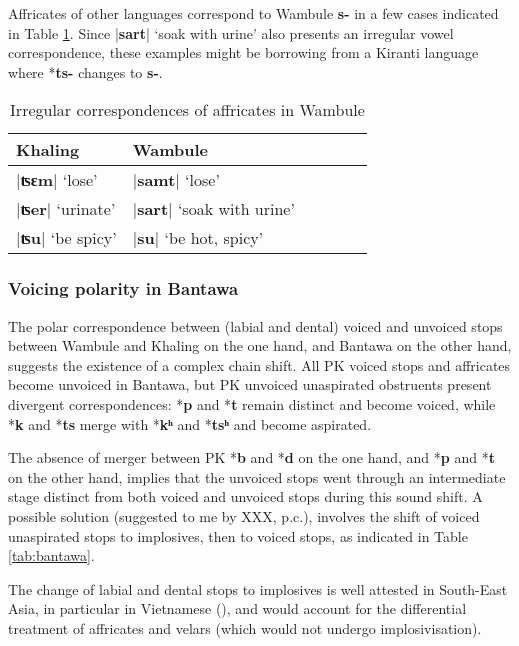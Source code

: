 \documentclass[oldfontcommands,oneside,a4paper,11pt]{article}
\newcommand{\ipa}[1]{\textbf{{\phon\mbox{#1}}}} %
\newcommand{\dhatu}[2]{|\ipa{#1}| `#2'}
\begin{document}
Affricates of other languages correspond to Wambule \ipa{s-} in a few cases indicated in Table \ref{tab:affricates.wambule}. Since \dhatu{sart}{soak with urine} also presents an irregular vowel correspondence, these examples might  be borrowing from a Kiranti language where *\ipa{ts-} changes to \ipa{s-}.

\begin{table}[H]
\caption{Irregular correspondences of affricates in Wambule} \centering \label{tab:affricates.wambule}
\begin{tabular}{llllll}
\toprule
Khaling & Wambule \\
\midrule
\dhatu{ʦɛm}{lose} & \dhatu{samt}{lose}\\
\dhatu{ʦer}{urinate} & \dhatu{sart}{soak with urine} \\
\dhatu{ʦu}{be spicy} & \dhatu{su}{be hot, spicy}\\
\bottomrule
\end{tabular}
\end{table}

\subsubsection{Voicing polarity in Bantawa} \label{sec:fourth}
The polar correspondence between (labial and dental) voiced and unvoiced stops between Wambule and Khaling on the one hand, and Bantawa on the other hand, suggests the existence of a complex chain shift. All PK voiced stops and affricates become unvoiced in Bantawa, but PK unvoiced unaspirated obstruents  present divergent correspondences: *\ipa{p} and *\ipa{t} remain distinct and become voiced, while *\ipa{k} and *\ipa{ts} merge with *\ipa{kʰ} and *\ipa{tsʰ} and become aspirated.

The absence of merger between PK *\ipa{b} and *\ipa{d} on the one hand, and *\ipa{p} and *\ipa{t} on the other hand, implies that the unvoiced stops went through an intermediate stage distinct from both voiced and unvoiced stops during this sound shift. A possible solution (suggested to me by XXX, p.c.), involves the shift of voiced unaspirated stops to implosives, then to voiced stops, as indicated in Table \ref{tab:bantawa}.

The change of labial and dental stops to implosives is well attested in South-East Asia, in particular in Vietnamese (\citealt{ferlus82spirantisation}), and would account for the differential treatment of affricates and velars (which would not undergo implosivisation). 
\end{document}
